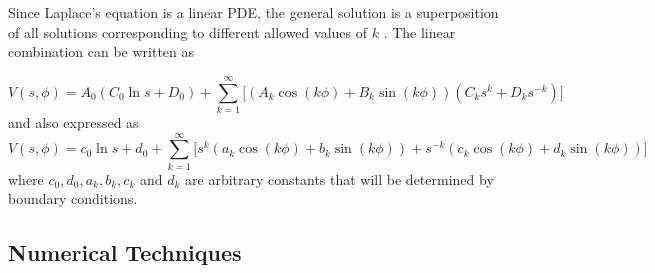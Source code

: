 \documentclass[a4paper]{jpconf}
\begin{document}


Since Laplace's equation is a linear PDE, the general solution is a superposition of all solutions corresponding to different allowed values of $k$ \cite{griffiths-introElec}. The linear combination can be written as

\begin{equation}
V(s, \phi) = A_0 (C_0 \ln{s} + D_0) + \sum_{k=1}^{\infty} \big[(A_k \cos{(k\phi)} + B_k \sin{(k\phi)}) (C_k s^k + D_k s^{-k})\big]
\label{eq:gs1}
\end{equation}
\noindent and also expressed as
\begin{equation}
V(s, \phi) = c_0 \ln{s} + d_0 + \sum_{k=1}^{\infty} \big[ s^k (a_k \cos{(k\phi)} + b_k \sin{(k\phi)}) + s^{-k}(c_k \cos{(k\phi)} + d_k \sin{(k\phi)})\big]
\label{eq:gs2}
\end{equation}
\noindent where $c_0, d_0, a_k, b_k, c_k$ and $d_k$ are arbitrary constants that will be determined by boundary conditions. 
\\ \par 

\subsection*{Numerical Techniques}
\end{document}
